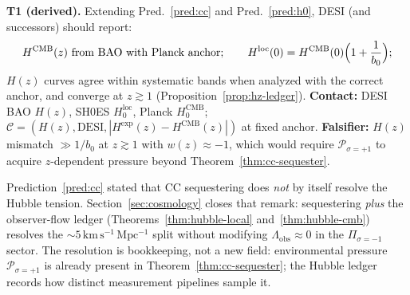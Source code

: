 \begin{prediction}\label{pred:hz}
\textbf{T1 (derived).} Extending Pred.~\ref{pred:cc} and Pred.~\ref{pred:h0},
DESI (and successors) should report:
\begin{equation}\label{eq:pred-hz}
  H^{\mathrm{CMB}}(z)\ \text{from BAO with Planck anchor};
  \qquad
  H^{\mathrm{loc}}(0)=H^{\mathrm{CMB}}(0)\Bigl(1+\frac{1}{b_0}\Bigr);
\end{equation}
$H(z)$ curves agree within systematic bands when analyzed with the correct
anchor, and converge at $z\gtrsim 1$ (Proposition~\ref{prop:hz-ledger}).
\textbf{Contact:} DESI BAO $H(z)$, SH0ES $H_0^{\mathrm{loc}}$,
Planck $H_0^{\mathrm{CMB}}$; $\mathcal{C}=(H(z),\mathrm{DESI},
|H^{\mathrm{exp}}(z)-H^{\mathrm{CMB}}(z)|)$ at fixed anchor.
\textbf{Falsifier:} $H(z)$ mismatch $\gg 1/b_0$ at $z\gtrsim 1$ with
$w(z)\approx -1$, which would require $\mathcal{P}_{\sigma=+1}$ to acquire
$z$-dependent pressure beyond Theorem~\ref{thm:cc-sequester}.
\end{prediction}

\begin{remark}
Prediction~\ref{pred:cc} stated that CC sequestering does \emph{not} by itself
resolve the Hubble tension. Section~\ref{sec:cosmology} closes that remark:
sequestering \emph{plus} the observer-flow ledger (Theorems~\ref{thm:hubble-local}
and~\ref{thm:hubble-cmb}) resolves the $\sim 5\,\mathrm{km\,s^{-1}\,Mpc^{-1}}$
split without modifying $\Lambda_{\mathrm{obs}}\approx 0$ in the
$\Pi_{\sigma=-1}$ sector. The resolution is bookkeeping, not a new field:
environmental pressure $\mathcal{P}_{\sigma=+1}$ is already present in
Theorem~\ref{thm:cc-sequester}; the Hubble ledger records how distinct
measurement pipelines sample it.
\end{remark}